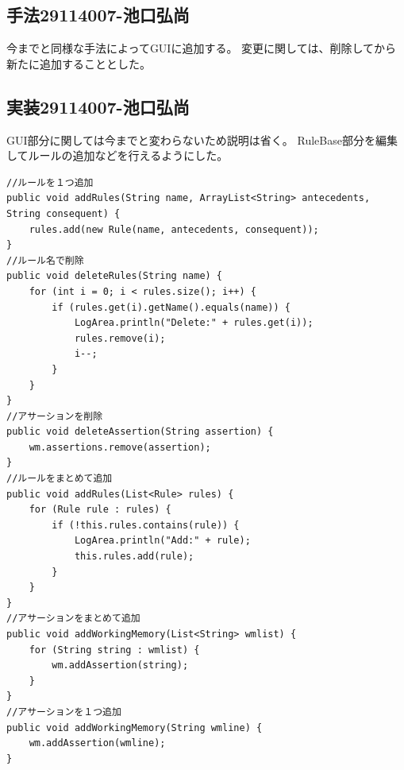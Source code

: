 \documentclass{jarticle}
\begin{document}
\subsection{手法29114007-池口弘尚}
今までと同様な手法によってGUIに追加する。
変更に関しては、削除してから新たに追加することとした。
\subsection{実装29114007-池口弘尚}
GUI部分に関しては今までと変わらないため説明は省く。
RuleBase部分を編集してルールの追加などを行えるようにした。
\begin{lstlisting}[caption=編集,label=src:Change]
//ルールを１つ追加
public void addRules(String name, ArrayList<String> antecedents, String consequent) {
	rules.add(new Rule(name, antecedents, consequent));
}
//ルール名で削除
public void deleteRules(String name) {
	for (int i = 0; i < rules.size(); i++) {
		if (rules.get(i).getName().equals(name)) {
			LogArea.println("Delete:" + rules.get(i));
			rules.remove(i);
			i--;
		}
	}
}
//アサーションを削除
public void deleteAssertion(String assertion) {
	wm.assertions.remove(assertion);
}
//ルールをまとめて追加
public void addRules(List<Rule> rules) {
	for (Rule rule : rules) {
		if (!this.rules.contains(rule)) {
			LogArea.println("Add:" + rule);
			this.rules.add(rule);
		}
	}
}
//アサーションをまとめて追加
public void addWorkingMemory(List<String> wmlist) {
	for (String string : wmlist) {
		wm.addAssertion(string);
	}
}
//アサーションを１つ追加
public void addWorkingMemory(String wmline) {
	wm.addAssertion(wmline);
}
\end{lstlisting}

\newpage
\end{document}
